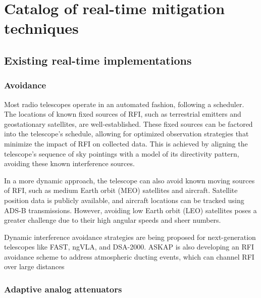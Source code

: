 \section{Catalog of real-time mitigation techniques}
\label{section:hardware:catalog}

\subsection{Existing real-time implementations}
\label{subsection:hardware:catalog:existing}
\subsubsection{Avoidance}
Most radio telescopes operate in an automated fashion, following a scheduler. The locations of known fixed sources of RFI, such as terrestrial emitters and geostationary satellites, are well-established. These fixed sources can be factored into the telescope's schedule, allowing for optimized observation strategies that minimize the impact of RFI on collected data. This is achieved by aligning the telescope's sequence of sky pointings with a model of its directivity pattern, avoiding these known interference sources.

In a more dynamic approach, the telescope can also avoid known moving sources of RFI, such as medium Earth orbit (MEO) satellites and aircraft. Satellite position data is publicly available, and aircraft locations can be tracked using ADS-B transmissions. However, avoiding low Earth orbit (LEO) satellites poses a greater challenge due to their high angular speeds and sheer numbers.

Dynamic interference avoidance strategies are being proposed for next-generation telescopes like FAST, ngVLA, and DSA-2000. ASKAP is also developing an RFI avoidance scheme to address atmospheric ducting events, which can channel RFI over large distances

\subsubsection{Adaptive analog attenuators}

